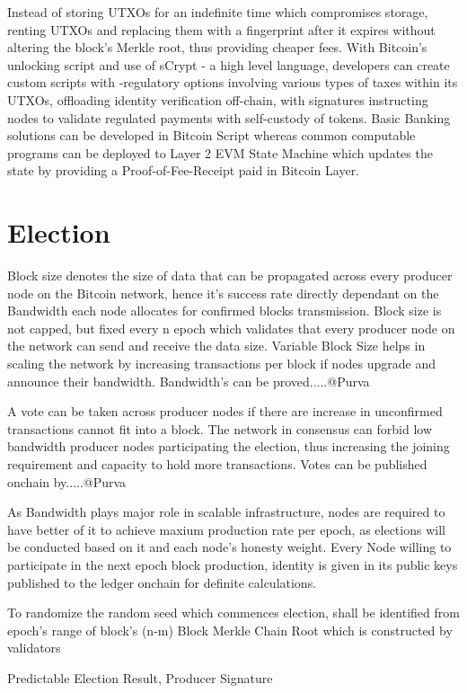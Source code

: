 \documentclass[a4paper,10pt]{article}
\begin{document}
Instead of storing UTXOs for an indefinite time which compromises storage, renting UTXOs and replacing them with a fingerprint after it expires without altering the block's Merkle root, thus providing cheaper fees. With Bitcoin's unlocking script and use of sCrypt - a high level language, developers can create custom scripts with -regulatory options involving various types of taxes within its UTXOs, offloading identity verification off-chain, with signatures instructing nodes to validate regulated payments with self-custody of tokens. Basic Banking solutions can be developed in Bitcoin Script whereas common computable programs can be deployed to Layer 2 EVM State Machine which updates the state by providing a Proof-of-Fee-Receipt paid in Bitcoin Layer. 

\section{Election}
Block size denotes the size of data that can be propagated across every producer node on the Bitcoin network, hence it's success rate directly dependant on the Bandwidth each node allocates for confirmed blocks transmission. Block size is not capped, but fixed every n epoch which validates that every producer node on the network can send and receive the data size. Variable Block Size helps in scaling the network by increasing transactions per block if nodes upgrade and announce their bandwidth. Bandwidth's can be proved.....@Purva

A vote can be taken across producer nodes if there are increase in unconfirmed transactions cannot fit into a block. The network in consensus can forbid low bandwidth producer nodes participating the election, thus increasing the joining requirement and capacity to hold more transactions. Votes can be published onchain by.....@Purva

As Bandwidth plays major role in scalable infrastructure, nodes are required to have better of it to achieve maxium production rate per epoch, as elections will be conducted based on it and each node's honesty weight. Every Node willing to participate in the next epoch block production, identity is given in its public keys published to the ledger onchain for definite calculations.

To randomize the random seed which commences election, shall be identified from epoch's range of block's (n-m) Block Merkle Chain Root which is constructed by validators

Predictable Election Result, Producer Signature
\end{document}
